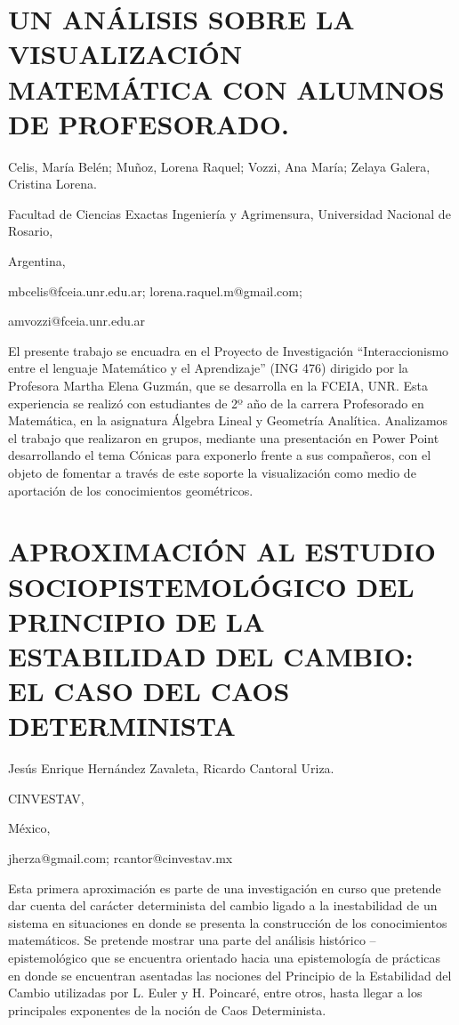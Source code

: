 \section{UN ANÁLISIS SOBRE LA VISUALIZACIÓN MATEMÁTICA CON ALUMNOS DE PROFESORADO.}

\begin{datos}

Celis, María Belén; Muñoz, Lorena Raquel; Vozzi, Ana María; Zelaya
Galera, Cristina Lorena.

Facultad de Ciencias Exactas Ingeniería y Agrimensura, Universidad
Nacional de Rosario, 

Argentina,

mbcelis@fceia.unr.edu.ar; lorena.raquel.m@gmail.com;

amvozzi@fceia.unr.edu.ar

\end{datos}

El presente trabajo se encuadra en el Proyecto de Investigación “Interaccionismo
entre el lenguaje Matemático y el Aprendizaje” (ING 476) dirigido
por la Profesora Martha Elena Guzmán, que se desarrolla en la FCEIA,
UNR. Esta experiencia se realizó con estudiantes de 2º año de la carrera
Profesorado en Matemática, en la asignatura Álgebra Lineal y Geometría
Analítica. Analizamos el trabajo que realizaron en grupos, mediante
una presentación en Power Point desarrollando el tema Cónicas para
exponerlo frente a sus compañeros, con el objeto de fomentar a través
de este soporte la visualización como medio de aportación de los conocimientos
geométricos. 


\section{APROXIMACIÓN AL ESTUDIO SOCIOPISTEMOLÓGICO DEL PRINCIPIO DE LA ESTABILIDAD
DEL CAMBIO: EL CASO DEL CAOS DETERMINISTA}

\begin{datos}

Jesús Enrique Hernández Zavaleta, Ricardo Cantoral Uriza.

CINVESTAV,

México,

jherza@gmail.com; rcantor@cinvestav.mx 

\end{datos}

Esta primera aproximación es parte de una investigación en curso que
pretende dar cuenta del carácter determinista del cambio ligado a
la inestabilidad de un sistema en situaciones en donde se presenta
la construcción de los conocimientos matemáticos. Se pretende mostrar
una parte del análisis histórico – epistemológico que se encuentra
orientado hacia una epistemología de prácticas en donde se encuentran
asentadas las nociones del Principio de la Estabilidad del Cambio
utilizadas por L. Euler y H. Poincaré, entre otros, hasta llegar a
los principales exponentes de la noción de Caos Determinista.


